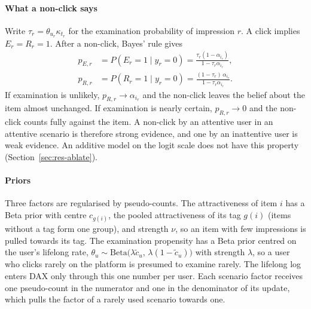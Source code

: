\paragraph{What a non-click says} Write $\tau_r=\theta_{u_r}\kappa_{t_r}$ for the examination probability of impression $r$. A click implies
$E_r=R_r=1$. After a non-click, Bayes' rule gives
\begin{equation}
  \begin{aligned}
  p_{E,r}&=P(E_r=1\mid y_r=0)=\frac{\tau_r(1-\alpha_{i_r})}{1-\tau_r\alpha_{i_r}},\\
  p_{R,r}&=P(R_r=1\mid y_r=0)=\frac{(1-\tau_r)\,\alpha_{i_r}}{1-\tau_r\alpha_{i_r}} .
  \end{aligned}
  \label{eq:posterior}
\end{equation}
If examination is unlikely, $p_{R,r}\to\alpha_{i_r}$ and the non-click leaves the belief about the item almost unchanged. If examination is
nearly certain, $p_{R,r}\to0$ and the non-click counts fully against the item. A non-click by an attentive user in an attentive scenario is
therefore strong evidence, and one by an inattentive user is weak evidence. An additive model on the logit scale does not have this property
(Section~\ref{sec:res-ablate}).

\paragraph{Priors} Three factors are regularised by pseudo-counts. The attractiveness of item $i$ has a Beta prior with centre $c_{g(i)}$,
the pooled attractiveness of its tag $g(i)$ (items without a tag form one group), and strength $\nu$, so an item with few impressions is pulled
towards its tag. The examination propensity has a Beta prior centred on the user's lifelong rate, $\theta_u\sim\mathrm{Beta}\bigl(\lambda\tilde c_u,\,
\lambda(1-\tilde c_u)\bigr)$ with strength $\lambda$, so a user who clicks rarely on the platform is presumed to examine rarely. The lifelong log
enters DAX only through this one number per user. Each scenario factor receives one pseudo-count in the numerator and one in the denominator of
its update, which pulls the factor of a rarely used scenario towards one.

